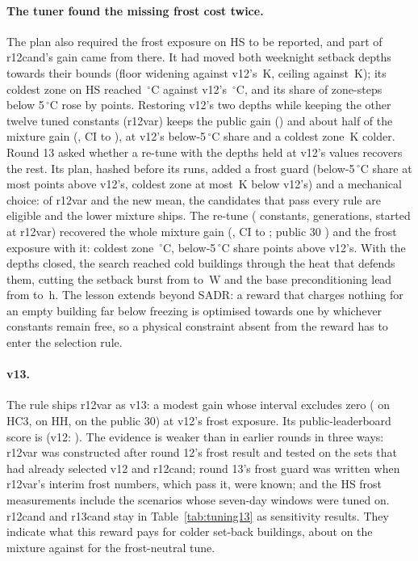 \documentclass{article}
\begin{document}
\paragraph{The tuner found the missing frost cost twice.} The plan also required the frost exposure on HS to be reported, and part of r12cand's gain came from there. It had moved both weeknight setback depths towards their bounds (floor widening \RTwCandNightLow{} against v12's \RTwVTwelveNightLow\,K, ceiling \RTwCandNightHigh{} against \RTwVTwelveNightHigh\,K); its coldest zone on HS reached \RTwCandColdest\,$^\circ$C against v12's \RTwVTwelveColdest\,$^\circ$C, and its share of zone-steps below 5\,$^\circ$C rose by \RTwCandBelowFiveRise{} points. Restoring v12's two depths while keeping the other twelve tuned constants (r12var) keeps the public gain (\RTwVarPub) and about half of the mixture gain (\RTwVarMix, CI \RTwVarMixLo{} to \RTwVarMixHi), at v12's below-5\,$^\circ$C share and a coldest zone \RTwVarColderK\,K colder. Round 13 asked whether a re-tune with the depths held at v12's values recovers the rest. Its plan, hashed before its runs, added a frost guard (below-5\,$^\circ$C share at most \RTwGuardPP{} points above v12's, coldest zone at most \RTwGuardK\,K below v12's) and a mechanical choice: of r12var and the new mean, the candidates that pass every rule are eligible and the lower mixture ships. The re-tune (\RTwNParamsThr{} constants, \RTwGensThr{} generations, started at r12var) recovered the whole mixture gain (\RTwThrMix, CI \RTwThrMixLo{} to \RTwThrMixHi; public 30 \RTwThrPub) and the frost exposure with it: coldest zone \RTwThrColdest\,$^\circ$C, below-5\,$^\circ$C share \RTwThrBelowFiveRise{} points above v12's. With the depths closed, the search reached cold buildings through the heat that defends them, cutting the setback burst from \RTwVarQSb{} to \RTwThrQSb\,W and the base preconditioning lead from \RTwVarLeadBase{} to \RTwThrLeadBase\,h. The lesson extends beyond SADR: a reward that charges nothing for an empty building far below freezing is optimised towards one by whichever constants remain free, so a physical constraint absent from the reward has to enter the selection rule.

\paragraph{v13.} The rule ships r12var as v13: a modest gain whose interval excludes zero (\RTwVarHCThree{} on HC3, \RTwVarHH{} on HH, \RTwVarPub{} on the public 30) at v12's frost exposure. Its public-leaderboard score is \RTwKagVThirteen{} (v12: \RTenKagVTwelve). The evidence is weaker than in earlier rounds in three ways: r12var was constructed after round 12's frost result and tested on the sets that had already selected v12 and r12cand; round 13's frost guard was written when r12var's interim frost numbers, which pass it, were known; and the HS frost measurements include the scenarios whose seven-day windows were tuned on. r12cand and r13cand stay in Table~\ref{tab:tuning13} as sensitivity results. They indicate what this reward pays for colder set-back buildings, about \RTwCandMixAbs{} on the mixture against \RTwVarMixAbs{} for the frost-neutral tune.
\end{document}
